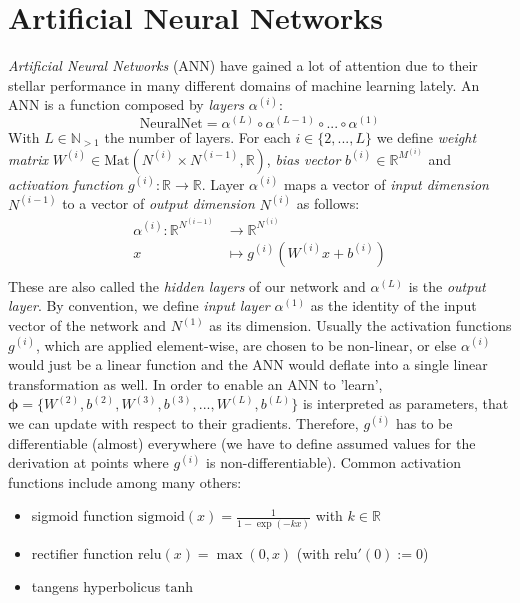 \documentclass[12pt]{report}
\theoremstyle{definition}
\begin{document}
\section{Artificial Neural Networks}
\emph{Artificial Neural Networks} (ANN) have gained a lot of attention due to their stellar performance in many different domains of machine learning lately. An ANN is a function composed by \emph{layers} $\alpha^{(i)}$:
\begin{equation}
\mathrm{NeuralNet} = \alpha^{(L)} \circ \alpha^{(L-1)} \circ ... \circ \alpha^{(1)}
\end{equation}
With $L \in \mathbb{N}_{>1}$ the number of layers. For each $i \in \{2, ..., L\} $ we define \emph{weight matrix} $W^{(i)} \in \mathrm{Mat}(N^{(i)} \times N^{(i-1)}, \mathbb{R})$, \emph{bias vector} $b^{(i)} \in \mathbb{R}^{M^{(i)}}$ and \emph{activation function} $g^{(i)}: \mathbb{R} \rightarrow \mathbb{R}$. Layer $\alpha^{(i)}$ maps a vector of \emph{input dimension} $N^{(i-1)}$ to a vector of \emph{output dimension} $N^{(i)}$ as follows:
\begin{equation}
\begin{split}
\alpha^{(i)}: \mathbb{R}^{N^{(i-1)}} & \rightarrow \mathbb{R}^{N^{(i)}} \\
x & \mapsto g^{(i)}(W^{(i)}x+b^{(i)})\\
\end{split}
\end{equation}
These are also called the \emph{hidden layers} of our network and $\alpha^{(L)}$ is the \emph{output layer}. By convention, we define \emph{input layer} $\alpha^{(1)}$ as the identity of the input vector of the network and $N^{(1)}$ as its dimension.
Usually the activation functions $g^{(i)}$, which are applied element-wise, are chosen to be non-linear, or else $\alpha^{(i)}$ would just be a linear function and the ANN would deflate into a single linear transformation as well.
In order to enable an ANN to 'learn', $\pmb{\phi} = \{W^{(2)},  b^{(2)}, W^{(3)},  b^{(3)}, ..., W^{(L)},  b^{(L)}\}$ is interpreted as parameters, that we can update with respect to their gradients. Therefore, $g^{(i)}$ has to be differentiable (almost) everywhere (we have to define assumed values for the derivation at points where $g^{(i)}$ is non-differentiable). Common activation functions include among many others:
\begin{itemize}
\item sigmoid function $\mathrm{sigmoid}(x) = \frac{1}{1 - \exp(-kx)}$ with $k \in \mathbb{R}$
\item rectifier function $\mathrm{relu}(x) = \max(0, x)$ (with $\mathrm{relu}'(0) := 0$)
\item tangens hyperbolicus $\mathrm{tanh}$
\end{itemize}
\end{document}
